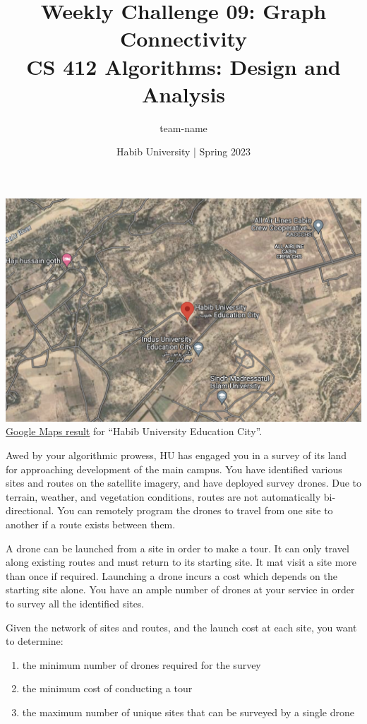 \documentclass[a4paper]{exam}
\title{Weekly Challenge 09: Graph Connectivity\\CS 412 Algorithms: Design and Analysis}
\author{team-name}  %
\date{Habib University | Spring 2023}
\begin{document}
\maketitle

\begin{questions}

  

  \begin{center}
    \includegraphics[width=.7\textwidth]{campus}\\
    \small \href{https://www.google.com/maps/place/Habib+University+Education+City%E2%80%AD/@25.0000165,67.4035345,776m/data=!3m2!1e3!4b1!4m6!3m5!1s0x394cb5ab8da5ad77:0xd1101c614558c064!8m2!3d25.0000165!4d67.4035345!16s%2Fg%2F11hfg1fyvd?hl=en-PK}{Google Maps result} for ``Habib University Education City''.    
  \end{center}

  Awed by your algorithmic prowess, HU has engaged you in a survey of its land for approaching development of the main campus. You have identified various sites and routes on the satellite imagery, and have deployed survey drones. Due to terrain, weather, and vegetation conditions, routes are not automatically bi-directional. You can remotely program the drones to travel from one site to another if a route exists between them.

  A drone can be launched from a site in order to make a tour. It can only travel along existing routes and must return to its starting site. It mat visit a site more than once if required. Launching a drone incurs a cost which depends on the starting site alone. You have an ample number of drones at your service in order to survey all the identified sites.

  Given the network of sites and routes, and the launch cost at each site, you want to determine:
  \begin{enumerate}
  \item the minimum number of drones required for the survey
  \item the minimum cost of conducting a tour
  \item the maximum number of unique sites that can be surveyed by a single drone
  \end{enumerate}


\end{questions}
\end{document}
